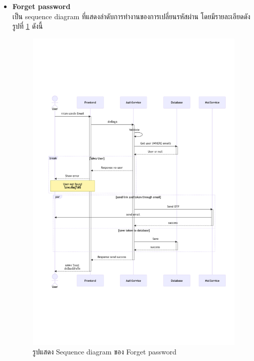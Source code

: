 \documentclass[12pt,oneside,openright,a4paper]{cpe-thai-project}
\begin{document}
\begin{itemize}
    \newpage
    \item \textbf{Forget password} \\
    เป็น sequence diagram ที่แสดงลำดับการทำงานของการเปลี่ยนรหัสผ่าน โดยมีรายละเอียดดังรูปที่ \ref{fig:sqForgetPassword} ดังนี้
    \begin{figure}[!ht]\centering
        \includegraphics[width=15cm, trim={0 7cm 0 7cm},clip]{./assets/sequence-diagram/forget-password.png}
        \caption{รูปแสดง Sequence diagram ของ Forget password}\label{fig:sqForgetPassword}
    \end{figure}


\end{itemize}
\end{document}
